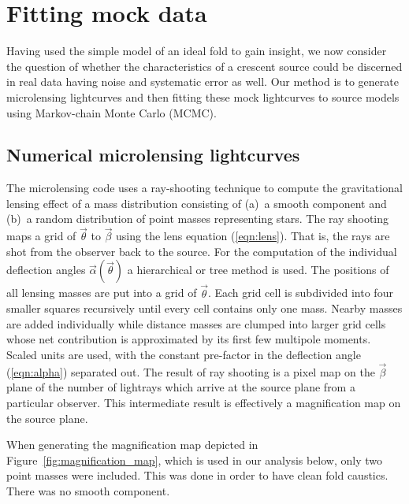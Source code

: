\documentclass[usenatbib]{mn2e}
\begin{document}
\section{Fitting mock data}\label{sec:numerics}

Having used the simple model of an ideal fold to gain insight, we now
consider the question of whether the characteristics of a crescent
source could be discerned in real data having noise and systematic
error as well.  Our method is to generate microlensing lightcurves
\citep[using the code from][with a small extension to provide the
  option of crescent sources]
      {1990PhDT.......180W,1999A&A...346L...5W,1999JCoAM.109..353W}
      and then fitting these mock lightcurves to source models using
      Markov-chain Monte Carlo (MCMC).

\subsection{Numerical microlensing lightcurves}

The microlensing code uses a ray-shooting technique to compute the
gravitational lensing effect of a mass distribution consisting of
(a)~a smooth component and (b)~a random distribution of point masses
representing stars.  The ray shooting maps a grid of $\vec\theta$ to
$\vec\beta$ using the lens equation (\ref{eqn:lens}).  That is, the
rays are shot from the observer back to the source.  For the
computation of the individual deflection angles
$\vec\alpha(\vec\theta)$ a hierarchical or tree method is used.  The
positions of all lensing masses are put into a grid of $\vec\theta$.
Each grid cell is subdivided into four smaller squares recursively
until every cell contains only one mass.  Nearby masses are added
individually while distance masses are clumped into larger grid cells
whose net contribution is approximated by its first few multipole
moments.  Scaled units are used, with the constant pre-factor in the
deflection angle (\ref{eqn:alpha}) separated out.  The result of ray
shooting is a pixel map on the $\vec\beta$ plane of the number of
lightrays which arrive at the source plane from a particular observer.
This intermediate result is effectively a magnification map on the
source plane.

When generating the magnification map depicted in
Figure~\ref{fig:magnification_map}, which is used in our analysis
below, only two point masses were included.  This was done in order to
have clean fold caustics.  There was no smooth component.
\end{document}
